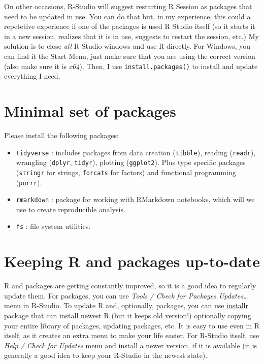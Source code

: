 \documentclass[
]{book}
\providecommand{\tightlist}{%
  \setlength{\itemsep}{0pt}\setlength{\parskip}{0pt}}
\begin{document}
On other occasions, R-Studio will suggest restarting R Session as packages that need to be updated in use. You can do that but, in my experience, this could a repetetive experience if one of the packages is used R Studio itself (so it starts it in a new session, realizes that it is in use, suggests to restart the session, etc.) My solution is to close \emph{all} R Studio windows and use R directly. For Windows, you can find it the Start Menu, just make sure that you are using the correct version (also make sure it is \emph{x64}). Then, I use \texttt{install.packages()} to install and update everything I need.

\hypertarget{minimal-set-of-packages}{%
\section{Minimal set of packages}\label{minimal-set-of-packages}}

Please install the following packages:

\begin{itemize}
\tightlist
\item
  \texttt{tidyverse} : includes packages from data creation (\texttt{tibble}), reading (\texttt{readr}), wrangling (\texttt{dplyr}, \texttt{tidyr}), plotting (\texttt{ggplot2}). Plus type specific packages (\texttt{stringr} for strings, \texttt{forcats} for factors) and functional programming (\texttt{purrr}).
\item
  \texttt{rmarkdown} : package for working with RMarkdown notebooks, which will we use to create reproducible analysis.
\item
  \texttt{fs} : file system utilities.
\end{itemize}

\hypertarget{installr}{%
\section{Keeping R and packages up-to-date}\label{installr}}

R and packages are getting constantly improved, so it is a good idea to regularly update them. For packages, you can use \emph{Tools / Check for Packages Updates\ldots{}} menu in R-Studio. To update R and, optionally, packages, you can use \href{https://www.r-project.org/nosvn/pandoc/installr.html}{installr} package that can install newest R (but it keeps old version!) optionally copying your entire library of packages, updating packages, etc. It is easy to use even in R itself, as it creates an extra menu to make your life easier. For R-Studio itself, use \emph{Help / Check for Updates} menu and install a newer version, if it is available (it is generally a good idea to keep your R-Studio in the newest state).
\end{document}

